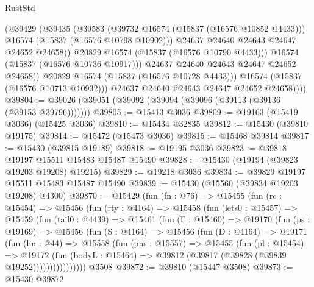 \begin{lexlean}{RustStd}
\begin{coremodule}
{\begin{coremodule}
{{{{{{{{{{{{{{{{{{{{{{{{{{{{{{{{{{{{{{{{{{{{{{{{{{{{{{{{{{{{                        (@39429
                          (@39435
                            (@39583
                              (@39732 @16574 (@15837 (@16576 @10852 @4433)))
                              @16574
                              (@15837 (@16576 @10798 @10902)))
                            @24637
                            @24640
                            @24643
                            @24647
                            @24652
                            @24658))
                        @20829
                        @16574
                        (@15837 (@16576 @10790 @4433)))
                      @16574
                      (@15837 (@16576 @10736 @10917)))
                    @24637
                    @24640
                    @24643
                    @24647
                    @24652
                    @24658))
                @20829
                @16574
                (@15837 (@16576 @10728 @4433)))
              @16574
              (@15837 (@16576 @10713 @10932)))
            @24637
            @24640
            @24643
            @24647
            @24652
            @24658))))
@39804 := @39026 (@39051 (@39092 (@39094 (@39096 (@39113 (@39136 (@39153 @39796)))))))
@39805 := @15413 @3036
@39809 := @19163 (@15419 @3036) (@15425 @3036)
@39810 := @15434 @32835
@39812 := @15430 (@39810 @19175)
@39814 := @15472 (@15473 @3036)
@39815 := @15468 @39814
@39817 := @15430 (@39815 @19189)
@39818 := @19195 @3036
@39823 := @39818 @19197 @15511 @15483 @15487 @15490
@39828 := @15430 (@19194 (@39823 @19203 @19208) @19215)
@39829 := @19218 @3036
@39834 := @39829 @19197 @15511 @15483 @15487 @15490
@39839 := @15430 (@15560 (@39834 @19203 @19208) @4300)
@39870 := @15429
    (fun (fn : @76) =>
    @15455
      (fun (rc : @15454) =>
      @15456
        (fun (rty : @4164) =>
        @15458
          (fun (lets0 : @15457) =>
          @15459
            (fun (tail0 : @4439) =>
            @15461
              (fun (Γ : @15460) =>
              @19170
                (fun (ps : @19169) =>
                @15456
                  (fun (S : @4164) =>
                  @15456
                    (fun (D : @4164) =>
                    @19171
                      (fun (hn : @44) =>
                      @15558
                        (fun (pns : @15557) =>
                        @15455
                          (fun (pl : @15454) =>
                          @19172
                            (fun (bodyL : @15464) =>
                            @39812 (@39817 (@39828 (@39839 @19252))))))))))))))))
    @3508
@39872 := @39810 (@15447 @3508)
@39873 := @15430 @39872
}}}}}}}}}}}}}}}}}}}}}}}}}}}}}}}}}}}}}}}}}}}}}}}}}}}}}}}}}}}}
\end{coremodule}}
\end{coremodule}
\end{lexlean}
